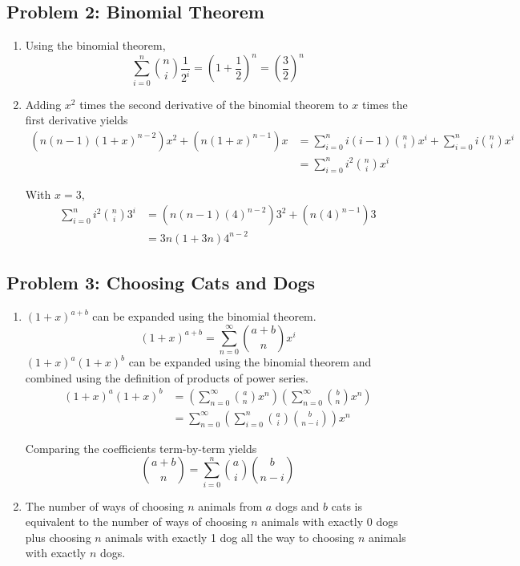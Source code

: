 \documentclass{report}
\begin{document}
\subsection*{Problem 2: Binomial Theorem}
\begin{enumerate}
   \item Using the binomial theorem,
   \[
      \sum_{i=0}^n \binom{n}{i} \frac{1}{2^i} 
      = \left(1+\frac{1}{2}\right)^n
      = \left(\frac{3}{2}\right)^n
   \]
   \item Adding $x^2$ times the second derivative of the binomial theorem to $x$ times the first derivative yields
   \begin{align*}
      (n(n-1)(1+x)^{n-2})x^2 + (n(1+x)^{n-1})x 
      &= \sum_{i=0}^{n} i(i-1)\binom{n}{i}x^{i} + \sum_{i=0}^{n} i\binom{n}{i}x^{i}\\
      &= \sum_{i=0}^{n} i^2\binom{n}{i}x^{i}
   \end{align*}
      

   With $x=3$,
   \begin{align*}
      \sum_{i=0}^{n} i^2\binom{n}{i}3^{i} 
      &= (n(n-1)(4)^{n-2})3^2 + (n(4)^{n-1})3 \\
      &= 3n(1+3n)4^{n-2}
   \end{align*}
\end{enumerate}
\newpage 

\subsection*{Problem 3: Choosing Cats and Dogs}
\begin{enumerate}
   \item $(1+x)^{a+b}$ can be expanded using the binomial theorem.
      \[
         (1+x)^{a+b} = \sum_{n=0}^{\infty} \binom{a+b}{n} x^i
      \]
      $(1+x)^{a}(1+x)^{b}$ can be expanded using the binomial theorem 
      and combined using the definition of products of power series.
      \begin{align*}
         (1+x)^{a}(1+x)^{b} 
         &= \left(\sum_{n=0}^{\infty} \binom{a}{n} x^n\right) 
         \left(\sum_{n=0}^{\infty} \binom{b}{n} x^n\right) \\
         &= \sum_{n=0}^{\infty} \left(\sum_{i=0}^n \binom{a}{i}\binom{b}{n-i}\right) x^n
      \end{align*}
         
      
      Comparing the coefficients term-by-term yields 
      \[
         \binom{a+b}{n} = \sum_{i=0}^n \binom{a}{i}\binom{b}{n-i}
      \]
   \item The number of ways of choosing $n$ animals from $a$ dogs and $b$ cats
      is equivalent to the number of ways of choosing $n$ animals with exactly
      0 dogs plus choosing $n$ animals with exactly 1 dog all the way to choosing 
      $n$ animals with exactly $n$ dogs.
\end{enumerate}
\newpage 
\end{document}
